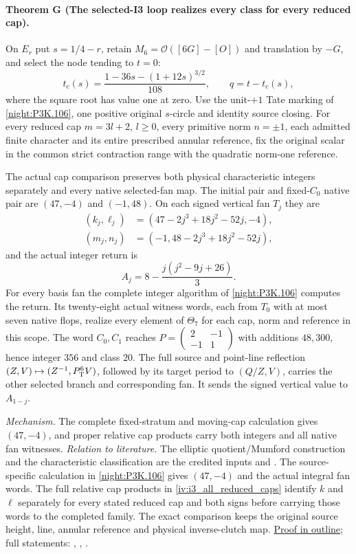 \hypertarget{main-IV-G}{}
\paragraph{Theorem G (The selected-I3 loop realizes every class for every reduced cap).}
\label{series:IV:G}
On $E_r$ put $s=1/4-r$, retain $M_6=\mathcal O([6G]-[O])$
and translation by $-G$, and select the node tending to $t=0$:
\[
 t_c(s)=\frac{1-36s-(1+12s)^{3/2}}{108},\qquad q=t-t_c(s),
\]
where the square root has value one at zero. Use the unit-$+1$
Tate marking of \cref{night:P3K.106}, one positive original
$s$-circle and identity source closing. For every reduced cap
$m=3l+2$, $l\ge0$, every primitive norm $n=\pm1$, each admitted
finite character and its entire prescribed annular reference, fix
the original scalar in the common strict contraction range with
the quadratic norm-one reference.

The actual cap comparison preserves both physical characteristic
integers separately and every native selected-fan map. The initial
pair and fixed-$C_0$ native pair are $(47,-4)$ and $(-1,48)$.
On each signed vertical fan $T_j$ they are
\[
\begin{aligned}
 (k_j,\ell_j)&=(47-2j^3+18j^2-52j,-4),\\
 (m_j,n_j)&=(-1,48-2j^3+18j^2-52j),
\end{aligned}
\]
and the actual integer return is
\[
 A_j=8-\frac{j(j^2-9j+26)}3.
\]
For every basis fan the complete integer algorithm of
\cref{night:P3K.106} computes the return. Its twenty-eight actual
witness words, each from $T_0$ with at most seven native flops,
realize every element of $\Theta_7$ for each cap, norm and
reference in this scope. The word $C_0,C_1$ reaches
$P=\left(\begin{smallmatrix}2&-1\\-1&1\end{smallmatrix}\right)$
with additions $48,300$, hence integer $356$ and class $20$.
The full source and point-line reflection
$(Z,V)\mapsto(Z^{-1},P_{\rm T}^6V)$, followed by its target period
to $(Q/Z,V)$, carries the other selected branch and corresponding
fan. It sends the signed vertical value to $A_{1-j}$.

\textit{Mechanism.} The complete fixed-stratum and moving-cap calculation gives
$(47,-4)$, and proper relative cap products carry both integers and all native fan witnesses.
\textit{Relation to literature.} The elliptic quotient/Mumford construction and the characteristic classification are the credited inputs \cite[Section~2 and Remark~8.5]{Engel2026} and \cite[Theorem~4.9 and Lemma~6.2]{Jin2026}. The source-specific calculation in \cref{night:P3K.106} gives $(47,-4)$ and the actual integral fan words. The full relative cap products in \cref{iv:i3_all_reduced_caps} identify $k$ and $\ell$ separately for every stated reduced cap and both signs before carrying those words to the completed family. The exact comparison keeps the original source height, line, annular reference and physical inverse-clutch map.
\hyperlink{outline-IV-G}{Proof in outline}; full statements: , , .


